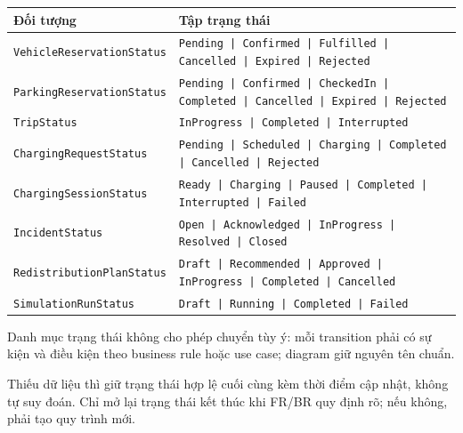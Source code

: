 \noindent\begin{minipage}{\linewidth}
  \centering
  \label{tab:workflow-statuses}
  \small
  \begin{tabularx}{\linewidth}{|L{49mm}|Y|}
  \hline
  \centering\arraybackslash\textbf{Đối tượng} & \centering\arraybackslash\textbf{Tập trạng thái}\\
  \hline
  \texttt{VehicleReservationStatus} & \texttt{Pending | Confirmed | Fulfilled | Cancelled | Expired | Rejected}\\
  \hline
  \texttt{ParkingReservationStatus} & \texttt{Pending | Confirmed | CheckedIn | Completed | Cancelled | Expired | Rejected}\\
  \hline
  \texttt{TripStatus} & \texttt{InProgress | Completed | Interrupted}\\
  \hline
  \texttt{ChargingRequestStatus} & \texttt{Pending | Scheduled | Charging | Completed | Cancelled | Rejected}\\
  \hline
  \texttt{ChargingSessionStatus} & \texttt{Ready | Charging | Paused | Completed | Interrupted | Failed}\\
  \hline
  \texttt{IncidentStatus} & \texttt{Open | Acknowledged | InProgress | Resolved | Closed}\\
  \hline
  \texttt{RedistributionPlanStatus} & \texttt{Draft | Recommended | Approved | InProgress | Completed | Cancelled}\\
  \hline
  \texttt{SimulationRunStatus} & \texttt{Draft | Running | Completed | Failed}\\
  \hline
  \end{tabularx}
\end{minipage}\par\medskip

Danh mục trạng thái không cho phép chuyển tùy ý: mỗi transition phải có sự kiện và điều kiện theo business rule hoặc use case; diagram giữ nguyên tên chuẩn.

Thiếu dữ liệu thì giữ trạng thái hợp lệ cuối cùng kèm thời điểm cập nhật, không tự suy đoán. Chỉ mở lại trạng thái kết thúc khi FR/BR quy định rõ; nếu không, phải tạo quy trình mới.

\clearpage
